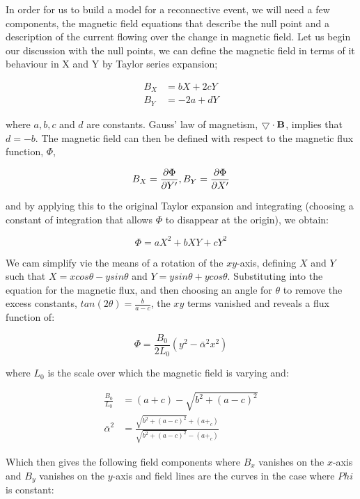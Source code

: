 In order for us to build a model for a reconnective event, we will need a few components, the magnetic field equations that describe the null point and a description of the current flowing over the change in magnetic field.
Let us begin our discussion with the null points, we can define the magnetic field in terms of it behaviour in X and Y by Taylor series expansion;

\begin{align}
	B_X &= bX + 2cY\\
	B_Y &= -2a + dY
\end{align}

where $a, b, c$ and $d$ are constants.
Gauss' law of magnetism, $\bigtriangledown \cdot \mathbf{B}$, implies that $d = -b$.
The magnetic field can then be defined with respect to the magnetic flux function, $\Phi$,

\begin{equation}
	B_X = \frac{\partial \Phi}{\partial Y' }, B_Y = \frac{\partial \Phi}{\partial X' }
\end{equation}  

and by applying this to the original Taylor expansion and integrating (choosing a constant of integration that allows $\Phi$ to disappear at the origin), we obtain:

\begin{equation}
	\Phi = aX^2 + bXY + cY^2
\end{equation}

We cam simplify vie the means of a rotation of the $xy$-axis, defining $X$ and $Y$ such that $X = xcos\theta - y sin\theta$ and $ Y = y sin\theta + y cos\theta$.
Substituting into the equation for the magnetic flux, and then choosing an angle for $\theta$ to remove the excess constants, $tan(2\theta) = \frac{b}{a - c}$, the $xy$ terms vanished and reveals a flux function of:

\begin{equation}
	\Phi = \frac{B_0}{2L_0}(y^2 - \bar{\alpha}^2x^2)
\end{equation}

where $L_0$ is the scale over which the magnetic field is varying and: 

\begin{align}
	\frac{B_0}{L_0} &= (a + c) - \sqrt{b^2 + (a - c)^2}\\
	\bar{\alpha}^2 &= \frac{\sqrt{b^2 + (a - c)^2} + (a +_c)}{\sqrt{b^2 + (a - c)^2} - (a +_c)}
\end{align}

Which then gives the following field components where $B_x$ vanishes on the $x$-axis and $B_y$ vanishes on the $y$-axis and field lines are the curves in the case where $Phi$ is constant:


